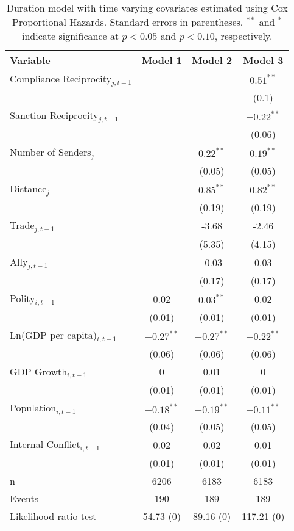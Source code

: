 \begin{table}[ht]
\centering
{\normalsize
\begin{tabular}{lccc}
 Variable & Model 1 & Model 2 & Model 3 \\ 
  \hline
\hline
Compliance Reciprocity$_{j,t-1}$ &  &  & $0.51^{\ast\ast}$ \\ 
   &  &  & (0.1) \\ 
  Sanction Reciprocity$_{j,t-1}$ &  &  & $-0.22^{\ast\ast}$ \\ 
   &  &  & (0.06) \\ 
   \hline
Number of Senders$_{j}$ &  & $0.22^{\ast\ast}$ & $0.19^{\ast\ast}$ \\ 
   &  & (0.05) & (0.05) \\ 
  Distance$_{j}$ &  & $0.85^{\ast\ast}$ & $0.82^{\ast\ast}$ \\ 
   &  & (0.19) & (0.19) \\ 
  Trade$_{j,t-1}$ &  & -3.68 & -2.46 \\ 
   &  & (5.35) & (4.15) \\ 
  Ally$_{j,t-1}$ &  & -0.03 & 0.03 \\ 
   &  & (0.17) & (0.17) \\ 
   \hline
Polity$_{i,t-1}$ & 0.02 & $0.03^{\ast\ast}$ & 0.02 \\ 
   & (0.01) & (0.01) & (0.01) \\ 
  Ln(GDP per capita)$_{i,t-1}$ & $-0.27^{\ast\ast}$ & $-0.27^{\ast\ast}$ & $-0.22^{\ast\ast}$ \\ 
   & (0.06) & (0.06) & (0.06) \\ 
  GDP Growth$_{i,t-1}$ & 0 & 0.01 & 0 \\ 
   & (0.01) & (0.01) & (0.01) \\ 
  Population$_{i,t-1}$ & $-0.18^{\ast\ast}$ & $-0.19^{\ast\ast}$ & $-0.11^{\ast\ast}$ \\ 
   & (0.04) & (0.05) & (0.05) \\ 
  Internal Conflict$_{i,t-1}$ & 0.02 & 0.02 & 0.01 \\ 
   & (0.01) & (0.01) & (0.01) \\ 
   \hline
n & 6206 & 6183 & 6183 \\ 
  Events & 190 & 189 & 189 \\ 
  Likelihood ratio test & 54.73 (0) & 89.16 (0) & 117.21 (0) \\ 
   \hline
\hline
\end{tabular}
}
\caption{Duration model with time varying covariates estimated using Cox Proportional Hazards. Standard errors in parentheses. $^{**}$ and $^{*}$ indicate significance at $p< 0.05 $ and $p< 0.10 $, respectively.} 
\label{tab:regResults}
\end{table}
